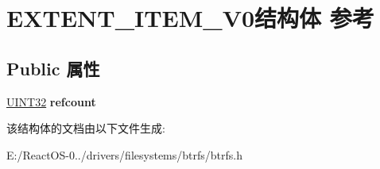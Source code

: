 \hypertarget{struct_e_x_t_e_n_t___i_t_e_m___v0}{}\section{E\+X\+T\+E\+N\+T\+\_\+\+I\+T\+E\+M\+\_\+\+V0结构体 参考}
\label{struct_e_x_t_e_n_t___i_t_e_m___v0}
\subsection*{Public 属性}
\begin{DoxyCompactItemize}
\item 
\mbox{\label{struct_e_x_t_e_n_t___i_t_e_m___v0_a1e9ea04b549377422e10894e2e3f5bf9}} 
\hyperlink{_processor_bind_8h_ae1e6edbbc26d6fbc71a90190d0266018}{U\+I\+N\+T32} {\bfseries refcount}
\end{DoxyCompactItemize}


该结构体的文档由以下文件生成\+:\begin{DoxyCompactItemize}
\item 
E\+:/\+React\+O\+S-\/0../drivers/filesystems/btrfs/btrfs.\+h\end{DoxyCompactItemize}
